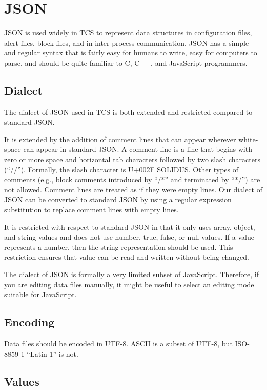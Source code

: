 \chapter{JSON}

JSON is used widely in TCS to represent data structures in configuration files, alert files, block files, and in inter-process communication. JSON has a simple and regular syntax that is fairly easy for humans to write, easy for computers to parse, and should be quite familiar to C, C++, and JavaScript programmers. 

\section{Dialect}

The dialect of JSON used in TCS is both extended and restricted compared to standard JSON.

It is extended by the addition of comment lines that can appear wherever white-space can appear in standard JSON. A comment line is a line that begins with zero or more space and horizontal tab characters followed by two slash characters (“//”). Formally, the slash character is U+002F SOLIDUS. Other types of comments (e.g., block comments introduced by “/*” and terminated by “*/”) are not allowed. Comment lines are treated as if they were empty lines. Our dialect of JSON can be converted to standard JSON by using a regular expression substitution to replace comment lines with empty lines.

It is restricted with respect to standard JSON in that it only uses array, object, and string values and does not use number, true, false, or null values. If a value represents a number, then the string representation should be used. This restriction ensures that value can be read and written without being changed.

The dialect of JSON is formally a very limited subset of JavaScript. Therefore, if you are editing data files manually, it might be useful to select an editing mode suitable for JavaScript.

\section{Encoding}

Data files should be encoded in UTF-8. ASCII is a subset of UTF-8, but ISO-8859-1 “Latin-1” is not.

\section{Values}

